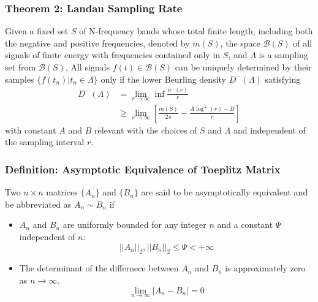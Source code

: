 \documentclass{beamer}
\begin{document}
\begin{frame}
\frametitle{Theorem 2: Landau Sampling Rate}
\begin{block}{}
  \cite[Th. 1 and Lemma 4]{Landau:1967} Given a fixed set $S$ of N-frequency bands whose total finite length, including both the negative and positive frequencies, denoted by $m(S)$, the space $\mathscr{B}(S)$ of all signals of finite energy with frequencies contained only in $S$, and $\Lambda$ is a sampling set from $\mathscr{B}(S)$, All signals $f(t)\in\mathscr{B}(S)$ can be uniquely determined by their samples $\{f(t_n)|t_n\in\Lambda\}$ only if the lower Beurling density $D^-(\Lambda)$ satisfying
  \begin{align}
    D^-(\Lambda) &= \lim_{r\to\infty}\inf\frac{n^-(r)}{r} \nonumber \\
    & \geq \lim_{r\to\infty}\left[\frac{m(S)}{2\pi}-\frac{A\log^+(r)-B}{r}\right]
   \end{align}
with constant $A$ and $B$ relevant with the choices of $S$ and $\Lambda$ and independent of the sampling interval $r$.
\end{block}
\end{frame}

\begin{frame}
\frametitle{Definition: Asymptotic Equivalence of Toeplitz Matrix}
\begin{block}{}
\cite{Gray:2006} Two $n\times n$ matrices $\{A_n\}$ and $\{B_n\}$ are said to be asymptotically equivalent and be abbreviated as $A_n\sim B_n$ if
  \begin{itemize}
    \item $A_n$ and $B_n$ are uniformly bounded for any integer $n$ and a constant $\Psi$ independent of $n$:
      \begin{equation}
        ||A_n||_2, ||B_n||_2\leq\Psi<+\infty
      \end{equation}
    \item The determinant of the differnece between $A_n$ and $B_n$ is approximately zero as $n\to\infty$.
      \begin{equation}
        \lim_{n\to\infty}|A_n-B_n|=0
      \end{equation}
  \end{itemize}
\end{block}
\end{frame}
\end{document}

